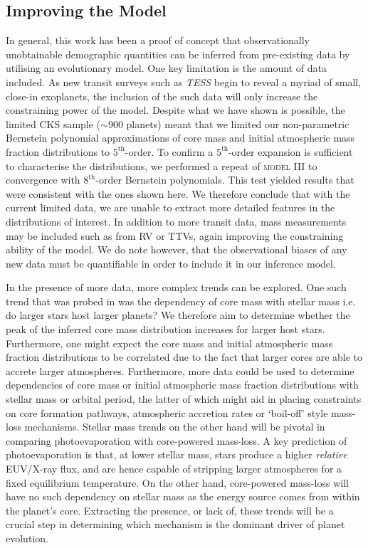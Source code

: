 \documentclass[fleqn,usenatbib]{mnras}
\newcommand{\correction}{\color{black}}
\begin{document}
\subsection{Improving the Model}
In general, this work has been a proof of concept that observationally unobtainable demographic quantities can be inferred from pre-existing data by utilising an evolutionary model. One key limitation is the amount of data included. As new transit surveys such as \textit{TESS} \citep{RICKER2014} begin to reveal a myriad of small, close-in exoplanets, the inclusion of the such data will only increase the constraining power of the model. Despite what we have shown is possible, the limited CKS sample ($\sim 900$ planets) meant that we limited our non-parametric Bernstein polynomial approximations of core mass and initial atmospheric mass fraction distributions to $5^\text{th}$-order. {\correction To confirm a $5^\text{th}$-order expansion is sufficient to characterise the distributions, we performed a repeat of \textsc{model III} to convergence with $8^\text{th}$-order Bernstein polynomials. This test yielded results that were consistent with the ones shown here. We therefore conclude that with the current limited data, we are unable to extract more detailed features in the distributions of interest.} In addition to more transit data, mass measurements may be included such as from RV or TTVs, again improving the constraining ability of the model. We do note however, that the observational biases of any new data must be quantifiable in order to include it in our inference model.

In the presence of more data, more complex trends can be explored. One such trend that was probed in \cite{Wu2019} was the dependency of core mass with stellar mass i.e. do larger stars host larger planets? We therefore aim to determine whether the peak of the inferred core mass distribution increases for larger host stars. Furthermore, one might expect the core mass and initial atmospheric mass fraction distributions to be correlated due to the fact that larger cores are able to accrete larger atmospheres. Furthermore, more data could be used to determine dependencies of core mass or initial atmospheric mass fraction distributions with stellar mass or orbital period, the latter of which might aid in placing constraints on core formation pathways, atmospheric accretion rates or `boil-off' style mass-loss mechanisms. Stellar mass trends on the other hand will be pivotal in comparing photoevaporation with core-powered mass-loss. A key prediction of photoevaporation is that, at lower stellar mass, stars produce a higher {\it relative} EUV/X-ray flux, and are hence capable of stripping larger atmospheres for a fixed equilibrium temperature. On the other hand, core-powered mass-loss will have no such dependency on stellar mass as the energy source comes from within the planet's core. Extracting the presence, or lack of, these trends will be a crucial step in determining which mechanism is the dominant driver of planet evolution.
\end{document}
